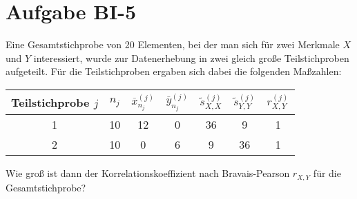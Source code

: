 
\section{Aufgabe BI-5}

\begin{task}
    Eine Gesamtstichprobe von 20 Elementen, bei der man sich für zwei Merkmale $X$ und $Y$ interessiert, wurde zur Datenerhebung in zwei gleich große Teilstichproben aufgeteilt. Für die Teilstichproben ergaben sich dabei die folgenden Maßzahlen:

    \begin{table}[H]
    \centering
    \begin{tabular}{c|cccccc}
        Teilstichprobe $j$ & $n_j$ & $\overline{x}_{n_j}^{(j)}$ & $\overline{y}_{n_j}^{(j)}$ & $\tilde{s}_{X,X}^{(j)}$ & $\tilde{s}_{Y,Y}^{(j)}$ & $r_{X,Y}^{(j)}$ \\ \hline
        1 & 10 & 12 & 0 & 36 & 9  & 1 \\
        2 & 10 & 0  & 6 & 9  & 36 & 1
    \end{tabular}
    \end{table}

    Wie groß ist dann der Korrelationskoeffizient nach Bravais-Pearson $r_{X,Y}$ für die Gesamtstichprobe?
\end{task}

